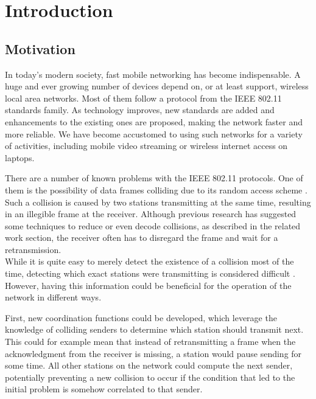 \chapter{Introduction}\label{ch:introduction}
\glsresetall %



\section{Motivation}

In today's modern society, fast mobile networking has become indispensable. A huge and ever growing number of devices depend on, or at least support, wireless local area networks. Most of them follow a protocol from the IEEE 802.11 standards family. As technology improves, new standards are added and enhancements to the existing ones are proposed, making the network faster and more reliable. We have become accustomed to using such networks for a variety of activities, including mobile video streaming or wireless internet access on laptops.

There are a number of known problems with the \gls{IEEE} 802.11 protocols. One of them is the possibility of data frames colliding due to its random access scheme \cite{bianchi2000}. Such a collision is caused by two stations transmitting at the same time, resulting in an illegible frame at the receiver. Although previous research has suggested some techniques to reduce or even decode collisions, as described in the related work section, the receiver often has to disregard the frame and wait for a retransmission.\\

While it is quite easy to merely detect the existence of a collision most of the time, detecting which exact stations were transmitting is considered difficult \cite{choi2013, keene2010}. However, having this information could be beneficial for the operation of the network in different ways.

First, new coordination functions could be developed, which leverage the knowledge of colliding senders to determine which station should transmit next. This could for example mean that instead of retransmitting a frame when the acknowledgment from the receiver is missing, a station would pause sending for some time. All other stations on the network could compute the next sender, potentially preventing a new collision to occur if the condition that led to the initial problem is somehow correlated to that sender.

